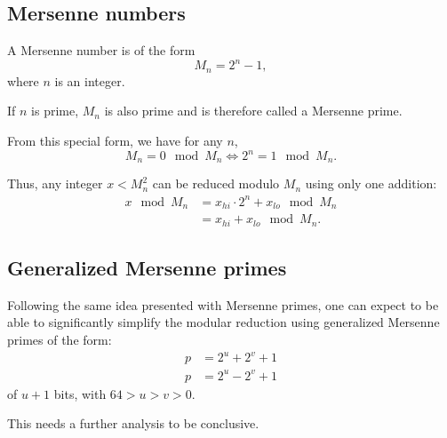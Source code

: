 \documentclass[a4paper]{article}
\begin{document}
\subsection{Mersenne numbers}

\begin{definition}
    A Mersenne number is of the form $$ M_n = 2^n-1,$$ where $n$ is an integer.

    If $n$ is prime, $M_n$ is also prime and is therefore called a Mersenne prime.
\end{definition}

From this special form, we have for any $n$,
\[
M_n = 0 \mod M_n \Longleftrightarrow 2^n = 1 \mod M_n.
\]

Thus, any integer $x < M_n^2$ can be reduced modulo $M_n$ using only one addition: 
\begin{align*}
x \mod M_n &= x_{hi}\cdot 2^{n} + x_{lo} \mod M_n \\
    &= x_{hi} + x_{lo} \mod M_n.
\end{align*}


\subsection{Generalized Mersenne primes}

Following the same idea presented with Mersenne primes, one can expect to be able to significantly simplify
the modular reduction using generalized Mersenne primes of the form:
\begin{align*}
    p &= 2^u + 2^v + 1 \\ 
    p &= 2^u - 2^v + 1 
\end{align*}
of $u+1$ bits, with $64 > u > v > 0$.

This needs a further analysis to be conclusive.
\end{document}
